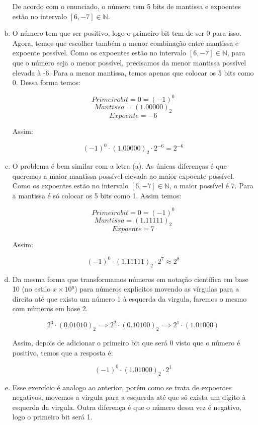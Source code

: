 \documentclass[11pt]{article}
\begin{document}
\begin{exerc}
\begin{enumerate}[a.]
De acordo com o enunciado, o número tem 5 bits de mantissa e expoentes estão no intervalo $[6, -7] \in \mathbb{N}$.

\item 
O número tem que ser positivo, logo o primeiro bit tem de ser 0 para isso. Agora, temos que escolher também a menor combinação entre mantissa e expoente possível. Como os expoentes estão no intervalo $[6, -7] \in \mathbb{N}$, para que o número seja o menor possível, precisamos da menor mantissa possível elevada à -6. Para a menor mantissa, temos apenas que colocar os 5 bits como 0. Dessa forma temos:

$$Primeiro bit = 0 = (-1)^0$$
$$Mantissa = (1.00000)_2$$
$$Expoente = -6$$

Assim:

$$(-1)^0 \cdot (1.00000)_{2} \cdot 2^{-6} = 2^{-6}$$



\item
O problema é bem similar com a letra (a). As únicas diferenças é que queremos a maior mantissa possível elevada ao maior expoente possível. Como os expoentes estão no intervalo $[6, -7] \in \mathbb{N}$, o maior possível é 7. Para a mantissa é só colocar os 5 bits como 1. Assim temos:

$$Primeiro bit = 0 = (-1)^0$$
$$Mantissa = (1.11111)_2$$
$$Expoente = 7$$

Assim:

$$(-1)^0 \cdot (1.11111)_2 \cdot 2^7 \approx 2^8$$

\item
Da mesma forma que transformamos números em notação científica em base 10 (no estilo $x \times 10^y$) para números explicitos movendo as vírgulas para a direita até que exista um número 1 à esquerda da virgula, faremos o mesmo com números em base 2.

$$2^3 \cdot (0.01010)_2 \implies 2^2 \cdot (0.10100)_2 \implies 2^1 \cdot (1.01000)$$

Assim, depois de adicionar o primeiro bit que será 0 visto que o número é positivo, temos que a resposta é:

$$(-1)^0 \cdot (1.01000)_2 \cdot 2^1$$

\item
Esse exercício é analogo ao anterior, porém como se trata de expoentes negativos, movemos a virgula para a esquerda até que só exista um dígito à esquerda da virgula. Outra diferença é que o número dessa vez é negativo, logo o primeiro bit será 1.


\end{enumerate}
\end{exerc}
\end{document}
